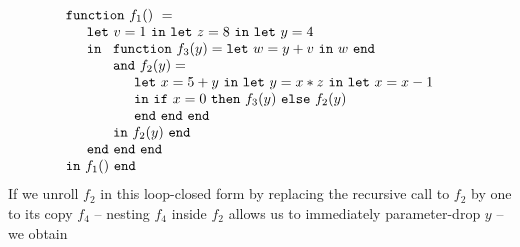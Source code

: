 \begin{equation}
\label{FunctionalConstructionProgram8}
\begin{array}{l}
\mathtt{function}\ f_1()\ = \\
  \quad
  \begin{array}{l}
     \mathtt{let}\ v = 1 \ 
     \mathtt{in\ let}\ z = 8 \ 
     \mathtt{in\ let}\ y = 4\\
     \mathtt{in}\ 
     \begin{array}[t]{l}
       \mathtt{function}\ f_3(y) = 
          \mathtt{let}\ w = y+v\ \mathtt{in}\ w\ \mathtt{end}\\
       \mathtt{and}\ f_2(y) =\\
         \quad
         \begin{array}{l}
           \mathtt{let}\ x = 5+y\
           \mathtt{in\ let}\ y = x*z\
           \mathtt{in\ let}\ x = x-1\\
           \mathtt{in}\
             \mathtt{if}\ x=0\
             \mathtt{then}\ f_3(y)\ 
             \mathtt{else}\ f_2(y)\\
           \mathtt{end\ end\ end}
         \end{array}\\
     \mathtt{in}\ f_2(y)\ \mathtt{end}
     \end{array}\\
     \mathtt{end\ end\ end}\\
   \end{array}\\
\mathtt{in}\ f_1()\  \mathtt{end}
\end{array}
\end{equation}
If we unroll $f_2$ in this loop-closed form by replacing the recursive
call to $f_2$ by one to its copy $f_4$ -- nesting $f_4$ inside $f_2$
allows us to immediately parameter-drop $y$ -- we obtain
